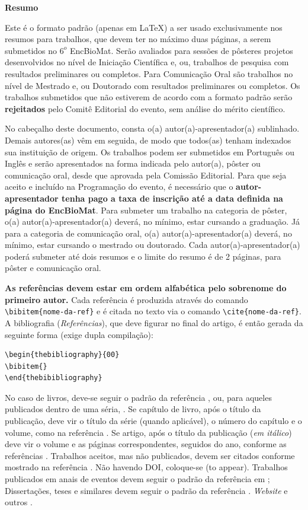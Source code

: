 \documentclass[a4paper, 11pt]{article}
\begin{document}
\begin{center}
\textbf{Resumo}
\end{center}

 Este é o formato padrão (apenas em \LaTeX) a ser usado exclusivamente nos resumos para trabalhos, que devem ter no máximo duas páginas, a serem submetidos no $6^o$ EncBioMat. Serão avaliados para sessões de pôsteres projetos desenvolvidos no nível de Iniciação Científica e, ou, trabalhos de pesquisa com resultados preliminares ou completos. Para Comunicação Oral são trabalhos no nível de Mestrado e, ou Doutorado com resultados preliminares ou completos. Os trabalhos submetidos que não estiverem de acordo com a formato padrão serão {\bf rejeitados} pelo Comitê Editorial do evento, sem análise do mérito científico.

 No cabeçalho deste documento, consta o(a) autor(a)-apresentador(a) sublinhado. Demais autores(as) vêm em seguida, de modo que todos(as) tenham indexados sua instituição de origem.
Os trabalhos podem ser submetidos em Português ou Inglês e serão apresentados na forma indicada pelo autor(a), pôster ou comunicação oral, desde que aprovada pela Comissão Editorial. Para que seja aceito e incluído na Programação do evento, é necessário que o {\bf autor-apresentador tenha pago a taxa de inscrição até a data definida na página do EncBioMat}. Para submeter um trabalho na categoria de pôster, o(a) autor(a)-apresentador(a) deverá, no mínimo, estar cursando a graduação. Já para a categoria de comunicação oral, o(a) autor(a)-apresentador(a) deverá, no mínimo, estar cursando o mestrado ou doutorado. Cada autor(a)-apresentador(a) poderá submeter até dois resumos e o limite do resumo é de 2 páginas, para pôster e comunicação oral.  

{\bf As referências devem estar em ordem alfabética pelo sobrenome do primeiro autor.} Cada referência é produzida através do comando  \verb!\bibitem{nome-da-ref}! e é citada no texto via o comando \verb!\cite{nome-da-ref}!. A bibliografia ({\it Referências}), que deve figurar no final do artigo, é então gerada da seguinte forma (exige dupla compilação):

\begin{verbatim}
\begin{thebibliography}{00}
\bibitem{}
\end{thebibibliography}
\end{verbatim}

 No caso de livros, deve-se seguir o padrão da referência \cite{Boldrini}, ou, para aqueles publicados dentro de uma séria, \cite{Gomes}. Se capítulo de livro, após o título da publicação, deve vir o título da série (quando aplicável), o número do capítulo e o volume, como na referência \cite{daSilva}. Se artigo, após o título da publicação ({\it em itálico}) deve vir o volume e as páginas correspondentes, seguidos do ano, conforme as referências \cite{Diniz2}. Trabalhos aceitos, mas não publicados, devem ser citados conforme mostrado na referência \cite{Cuminato}. Não havendo DOI, coloque-se (to appear). Trabalhos publicados em anais de eventos devem seguir o padrão da referência em \cite{Santos}; Dissertações, teses e similares devem seguir o padrão da referência \cite{Diniz1}. {\it Website} e outros \cite{ENCBIOMAT}.
\end{document}
